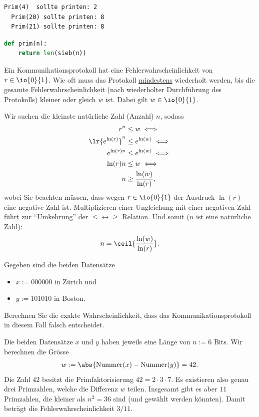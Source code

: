 \begin{questions}
\begin{lstlisting}[numbers=none]
  Prim(4)  sollte printen: 2
  Prim(20) sollte printen: 8
  Prim(21) sollte printen: 8
\end{lstlisting}
	\begin{solution}
		\begin{lstlisting}[language=Python,caption=Prim,numbers=none]
def prim(n):
    return len(sieb(n))
\end{lstlisting}
	\end{solution}

	\question[3]

	Ein Kommunikationsprotokoll hat eine Fehlerwahrscheinlichkeit von $r\in\io{0}{1}$. Wie oft muss das Protokoll \underline{mindestens} wiederholt werden, bis die gesamte Fehlerwahrscheinlichkeit (nach wiederholter Durchführung des Protokolls) kleiner oder gleich $w$ ist. Dabei gilt $w\in\io{0}{1}$.
	\begin{solution}
		Wir suchen die kleinste natürliche Zahl (Anzahl) $n$, sodass
		\begin{align*}
			r^n               & \leq w\iff                  \\
			\lr{e^{\ln(r)}}^n & \leq e^{\ln(w)}\iff         \\
			e^{\ln(r)n}       & \leq e^{\ln(w)} \iff        \\
			\ln(r)n           & \leq w \iff                 \\
			n                 & \geq \frac{\ln(w)}{\ln(r)},
		\end{align*}
		wobei Sie beachten müssen, dass wegen $r\in\io{0}{1}$ der Ausdruck $\ln(r)$ eine negative Zahl ist. Multiplizieren einer Ungleichung mit einer negativen Zahl führt zur \enquote{Umkehrung} der $\leq\leftrightarrow \geq$ Relation.
		Und somit ($n$ ist eine natürliche Zahl):
		\begin{align*}
			n = \ceil{\frac{\ln(w)}{\ln(r)}}.
		\end{align*}
	\end{solution}

	\question[3] Gegeben sind die beiden Datensätze
	\begin{itemize}
		\item $x := 000000$ in Zürich und
		\item $y := 101010$ in Boston.
	\end{itemize}
	Berechnen Sie die exakte Wahrscheinlichkeit, dass das Kommunikationsprotokoll in diesem Fall falsch entscheidet.
	\begin{solution}
		Die beiden Datensätze $x$ und $y$ haben jeweils eine Länge von $n := 6$ Bits.
		Wir berechnen die Grösse
		\begin{align*}
			w := \abs{\text{Nummer}(x) - \text{Nummer}(y)} = 42.
		\end{align*}
		Die Zahl $42$ besitzt die Primfaktorisierung $42 = 2\cdot 3\cdot 7$. Es existieren also genau drei Primzahlen, welche die Differenz $w$ teilen. Insgesamt gibt es aber $11$ Primzahlen, die kleiner als $n^2 = 36$ sind (und gewählt werden könnten). Damit beträgt die Fehlerwahrscheinlichkeit $3/11$.
	\end{solution}


\end{questions}
